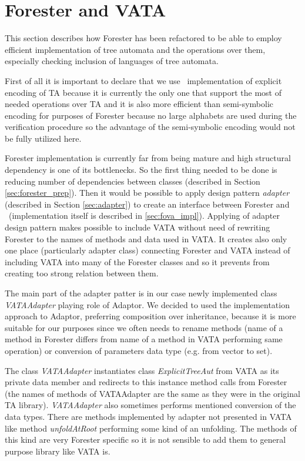 \documentclass[fleqn,11pt]{ExcelAtFIT} %
\begin{document}
\section{Forester and VATA}
\label{sec:forvata}

This section describes how Forester has been refactored to be able to employ \vata
efficient implementation of	tree automata and the operations over them,
especially checking inclusion of languages of tree automata.

First of all it is important to declare that we use \vata\ implementation of explicit encoding of TA because
it is currently the only one that support the most of needed operations over TA and it is also more efficient than
semi-symbolic encoding for purposes of Forester because no large alphabets are used during the verification procedure
so the advantage of the semi-symbolic encoding would not be fully utilized here.

Forester implementation is currently far from being mature and high structural dependency is
one of its bottlenecks.
So the first thing needed to be done is reducing number of dependencies between classes (described in Section \ref{sec:forester_prep}).
Then it would be possible to apply design pattern \emph{adapter} \cite{gamma95} (described in Section \ref{sec:adapter}) to create
an interface between Forester and \vata\ (implementation itself is described in \ref{sec:fova_impl}).
Applying of adapter design pattern makes possible to include VATA without need of rewriting
Forester to the names of methods and data used in VATA.
It creates also only one place (particularly adapter class) connecting Forester and VATA instead of
including VATA into many of the Forester classes and so it prevents from creating too strong relation between them.

The main part of the adapter patter is in our case newly implemented class \emph{VATAAdapter} playing role of Adaptor.
We decided to used the implementation approach to Adaptor, preferring composition over inheritance,
because it is more suitable for our purposes since we often needs to rename methods 
(name of a method in Forester differs from name of a method in VATA performing same operation)
or conversion of parameters data type (e.g. from vector to set). 

The class \emph{VATAAdapter} instantiates class \emph{ExplicitTreeAut} from VATA as its private data member
and redirects to this instance method calls from Forester (the names of methods of VATAAdapter are the same as they were
in the original TA library).
\emph{VATAAdapter} also sometimes performs mentioned conversion of the data types.
There are methods implemented by adapter not presented in VATA like method \emph{unfoldAtRoot}
performing some kind of an unfolding.
The methods of this kind are very Forester specific so it is not sensible to add them to general purpose library like VATA is.
\end{document}
